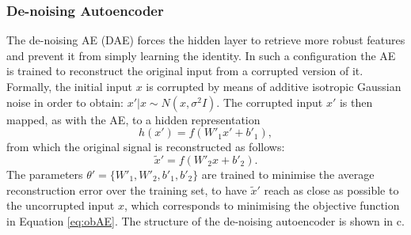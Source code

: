 \subsubsection{De-noising Autoencoder}\label{sssec:backg:dnn:dAE}
The de-noising AE (DAE) \cite{Vincent10-SDA} forces the hidden layer to retrieve more robust features and prevent it from simply learning the identity. In such a configuration the AE is trained to reconstruct the original input from a corrupted version of it. Formally, the initial input $x$ is corrupted by means of additive isotropic Gaussian noise in order to obtain: $x'|x \sim N(x,\sigma^2I)$. The corrupted input $x'$ is then mapped, as with the AE, to a hidden representation
\begin{equation} %
  h(x') = f(W'_{1}x' +b'_{1}), 
\end{equation}
from which the original signal is reconstructed as follows:
\begin{equation} %
  \tilde{x}' = f(W'_{2}x +b'_{2}). 
\end{equation}
The parameters $\theta'=\{W'_{1},W'_{2},b'_{1},b'_{2}\}$ are trained to minimise the average reconstruction error over the training set, to have $\tilde{x}'$ reach as close as possible to the uncorrupted input $x$, which corresponds to minimising the objective function in Equation \ref{eq:obAE}.
The structure of the de-noising autoencoder is shown in c.









